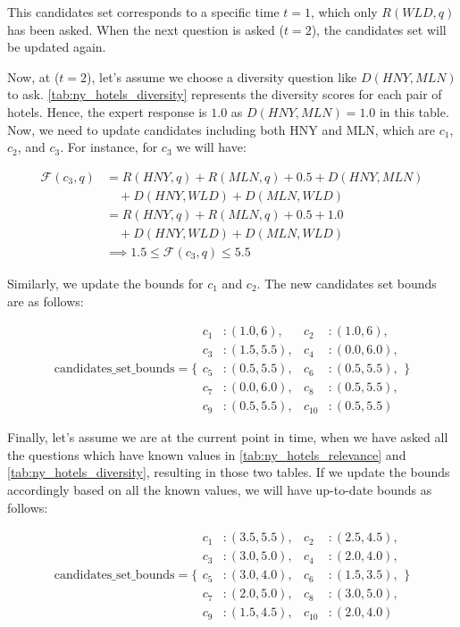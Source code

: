 This candidates set corresponds to a specific time \( t = 1 \), which only \( R(WLD, q) \) has been asked. When the next question is asked (\( t = 2 \)), the candidates set will be updated again.

Now, at (\( t = 2 \)), let's assume we choose a diversity question like \( D(HNY, MLN) \) to ask. \autoref{tab:ny_hotels_diversity} represents the diversity scores for each pair of hotels. Hence, the expert response is \(1.0\) as \( D(HNY, MLN) = 1.0\) in this table. Now, we need to update candidates including both HNY and MLN, which are \( c_{1} \), \( c_{2} \), and \( c_{3} \). For instance, for \( c_{3} \) we will have:

\begin{align*}
\mathcal{F}(c_3, q) & = R(HNY, q) + R(MLN, q) + 0.5 + D(HNY, MLN) \\
          & \quad + D(HNY, WLD) + D(MLN, WLD) \\
          & = R(HNY, q) + R(MLN, q) + 0.5 + 1.0 \\
          & \quad + D(HNY, WLD) + D(MLN, WLD) \\
          & \implies 1.5 \leq \mathcal{F}(c_3, q) \leq 5.5
\end{align*}

Similarly, we update the bounds for \( c_{1} \) and \( c_{2} \). The new candidates set bounds are as follows:

\[
\text{candidates\_set\_bounds} = \{ 
\begin{aligned}
c_1 &: (1.0, 6), & c_2 &: (1.0, 6), \\
c_3 &: (1.5, 5.5), & c_4 &: (0.0, 6.0), \\
c_5 &: (0.5, 5.5), & c_6 &: (0.5, 5.5), \\
c_7 &: (0.0, 6.0), & c_8 &: (0.5, 5.5), \\
c_9 &: (0.5, 5.5), & c_{10} &: (0.5, 5.5)
\end{aligned}
\}
\]

Finally, let's assume we are at the current point in time, when we have asked all the questions which have known values in \autoref{tab:ny_hotels_relevance} and \autoref{tab:ny_hotels_diversity}, resulting in those two tables. If we update the bounds accordingly based on all the known values, we will have up-to-date bounds as follows:

\[
\text{candidates\_set\_bounds} = \{ 
\begin{aligned}
c_1 &: (3.5, 5.5), & c_2 &: (2.5, 4.5), \\
c_3 &: (3.0, 5.0), & c_4 &: (2.0, 4.0), \\
c_5 &: (3.0, 4.0), & c_6 &: (1.5, 3.5), \\
c_7 &: (2.0, 5.0), & c_8 &: (3.0, 5.0), \\
c_9 &: (1.5, 4.5), & c_{10} &: (2.0, 4.0)
\end{aligned}
\}
\]
